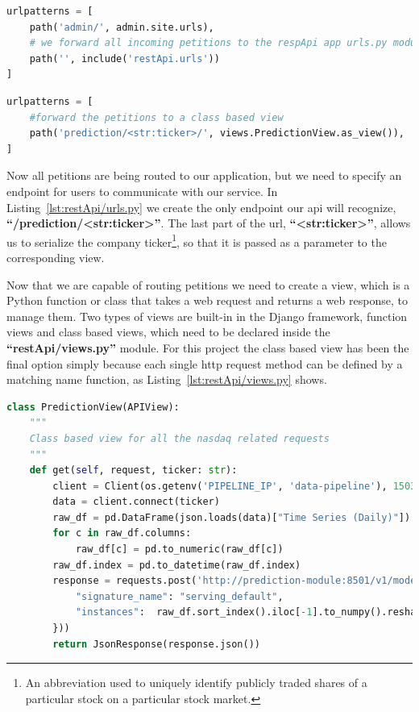 \begin{lstlisting}[language=python,caption=apiGateway/urls.py,label={lst:root/urls.py}]
urlpatterns = [
    path('admin/', admin.site.urls),
    # we forward all incoming petitions to the respApi app urls.py module
    path('', include('restApi.urls')) 
]
\end{lstlisting}

\begin{lstlisting}[language=python,caption=restApi/urls.py,label={lst:restApi/urls.py}]
urlpatterns = [
    #forward the petitions to a class based view
    path('prediction/<str:ticker>/', views.PredictionView.as_view()),
]
\end{lstlisting}

Now all petitions are being routed to our application, but we need to specify an endpoint for users to communicate with our service. In Listing~\ref{lst:restApi/urls.py} we create the only endpoint our \gls{api} will recognize, \textbf{\enquote{/prediction/<str:ticker>}}. The last part of the url, \textbf{\enquote{<str:ticker>}}, allows us to serialize the company ticker\footnote{An abbreviation used to uniquely identify publicly traded shares of a particular stock on a particular stock market.}, so that it is passed as a parameter to the corresponding view.

Now that we are capable of routing petitions we need to create a view, which is a Python function or class that takes a web request and returns a web response, to manage them. Two types of views are built-in in the Django framework, function views and class based views, which need to be declared inside the \textbf{\enquote{restApi/views.py}} module. For this project the class based view has been the final option simply because each single \gls{http} request method can be defined by a matching name function, as Listing~\ref{lst:restApi/views.py} shows.

\begin{lstlisting}[language=python,caption=restApi/views.py,label={lst:restApi/views.py}]
class PredictionView(APIView):
    """
    Class based view for all the nasdaq related requests
    """
    def get(self, request, ticker: str):
        client = Client(os.getenv('PIPELINE_IP', 'data-pipeline'), 15032)
        data = client.connect(ticker)
        raw_df = pd.DataFrame(json.loads(data)["Time Series (Daily)"]).T
        for c in raw_df.columns:
            raw_df[c] = pd.to_numeric(raw_df[c])
        raw_df.index = pd.to_datetime(raw_df.index)
        response = requests.post('http://prediction-module:8501/v1/models/{model}:predict', data=json.dumps({
            "signature_name": "serving_default",
            "instances":  raw_df.sort_index().iloc[-1].to_numpy().reshape(1, 5).tolist()
        }))
        return JsonResponse(response.json())
\end{lstlisting}

